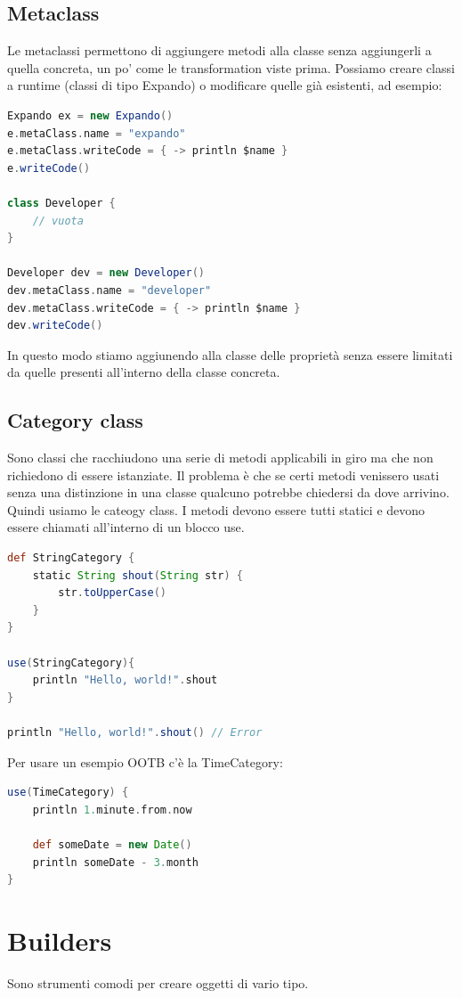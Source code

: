 \documentclass[11pt,a4paper]{book}
\begin{document}
\section{Metaclass}
Le metaclassi permettono di aggiungere metodi alla classe senza aggiungerli a quella concreta, un po' come le transformation viste prima. Possiamo creare classi a runtime (classi di tipo Expando) o modificare quelle già esistenti, ad esempio:
\begin{lstlisting}[language = groovy]
Expando ex = new Expando()
e.metaClass.name = "expando"
e.metaClass.writeCode = { -> println $name }
e.writeCode()

class Developer {
	// vuota
}

Developer dev = new Developer()
dev.metaClass.name = "developer"
dev.metaClass.writeCode = { -> println $name }
dev.writeCode()
\end{lstlisting}

In questo modo stiamo aggiunendo alla classe delle proprietà senza essere limitati da quelle presenti all'interno della classe concreta.

\section{Category class}
Sono classi che racchiudono una serie di metodi applicabili in giro ma che non richiedono di essere istanziate. Il problema è che se certi metodi venissero usati senza una distinzione in una classe qualcuno potrebbe chiedersi da dove arrivino. Quindi usiamo le cateogy class. I metodi devono essere tutti statici e devono essere chiamati all'interno di un blocco use.
\begin{lstlisting}[language = groovy]
def StringCategory {
	static String shout(String str) {
		str.toUpperCase()
	}
}

use(StringCategory){
	println "Hello, world!".shout	
}

println "Hello, world!".shout() // Error
\end{lstlisting}
Per usare un esempio OOTB c'è la TimeCategory:
\begin{lstlisting}[language = groovy]
use(TimeCategory) {
	println 1.minute.from.now
	
	def someDate = new Date()
	println someDate - 3.month
}
\end{lstlisting}

\chapter{Builders}
Sono strumenti comodi per creare oggetti di vario tipo.
\end{document}
